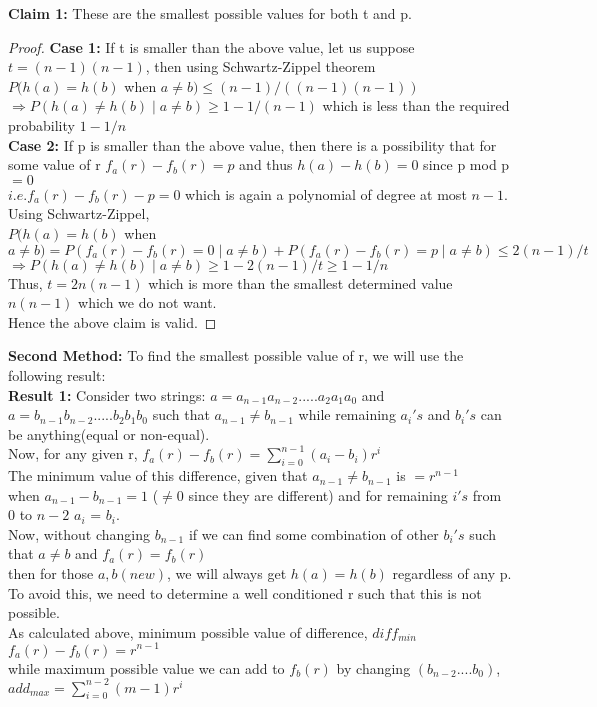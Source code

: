 \documentclass[11pt]{article}
\begin{document}
\textbf{Claim 1:} These are the smallest possible values for both t and p. 
\begin{proof}
	\textbf{Case 1:} If t is smaller than the above value, let us suppose $t = (n-1)(n-1)$, then using Schwartz-Zippel theorem \\
	$P(h(a) = h(b)$ when $a \neq b) \leq (n-1)/((n-1)(n-1))$ \\
	$\Rightarrow P(h(a) \neq h(b) \mid a \neq b) \geq 1 - 1/(n-1)$  which is less than the required probability $1 - 1/n$ \\
	\textbf{Case 2:} If p is smaller than the above value, then there is a possibility that for some value of r 
	$f_a(r) - f_b(r) = p$ and thus $h(a) - h(b) = 0$ since p mod p $= 0$\\
	$i.e. f_a(r) - f_b(r) - p = 0$ which is again a polynomial of degree at most $n-1$. Using Schwartz-Zippel, \\
	$P(h(a) = h(b)$ when $a \neq b) = P(f_a(r) - f_b(r) = 0 \mid a \neq b) + P(f_a(r) - f_b(r) = p \mid a \neq b) \leq 2(n-1)/t$
	$\Rightarrow P(h(a) \neq h(b) \mid a \neq b) \geq 1 - 2(n-1)/t \geq 1 - 1/n$ \\
	Thus, $t = 2n(n-1)$ which is more than  the smallest determined value $n(n-1)$ which we do not want. \\
	Hence the above claim is valid.
\end{proof}

\textbf{Second Method:}
To find the smallest possible value of r, we will use the following result: \\

\textbf{Result 1:} Consider two strings: $a = a_{n-1}a_{n-2}.....a_2a_1a_0$ and $a = b_{n-1}b_{n-2}.....b_2b_1b_0$ such that $a_{n-1} 
\neq b_{n-1}$
while  remaining $a_i's$ and $b_i's$ can be anything(equal or non-equal). \\
Now, for any given r, $f_a(r) - f_b(r) =  \sum_{i=0}^{n-1} (a_i-b_i)r^i$ \\
The minimum value of this difference, given that $a_{n-1} \neq b_{n-1}$ is $ = r^{n-1}$ \\
when $a_{n-1} - b_{n-1} = 1$ ($\neq 0$ since they are different) and for remaining $i's$ from $0$ to $n-2$ $a_i$ = $b_i$. \\
Now,  without changing $b_{n-1}$  if we can find some combination of other $b_i's$ such that $a \neq b$ and $f_a(r) = f_b(r)$ \\
then for those $a, b(new)$, we will always get $h(a) = h(b)$ regardless of any p. \\
To avoid this, we need to determine a well conditioned r such that this is not possible. \\
As calculated above, minimum possible value of difference, $diff_{min}$ $f_a(r) - f_b(r) = r^{n-1}$ \\
while maximum possible value we can add to $f_b(r)$ by changing $(b_{n-2}....b_0)$, $add_{max} = \sum_{i=0}^{n-2}(m-1)r^i$ \\
\end{document}
